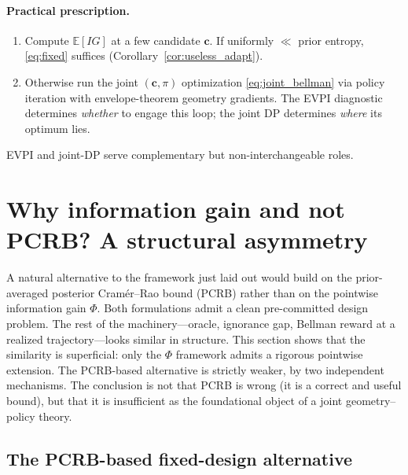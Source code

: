 \documentclass[11pt,a4paper]{article}
\newcommand{\E}{\mathbb{E}}
\begin{document}
\paragraph{Practical prescription.}
\begin{enumerate}[nosep, leftmargin=2em]
  \item Compute $\E[IG]$ at a few candidate $\bm{c}$.  If uniformly $\ll$ prior entropy, \eqref{eq:fixed} suffices (Corollary~\ref{cor:useless_adapt}).
  \item Otherwise run the joint $(\bm{c}, \pi)$ optimization \eqref{eq:joint_bellman} via policy iteration with envelope-theorem geometry gradients.  The EVPI diagnostic determines \emph{whether} to engage this loop; the joint DP determines \emph{where} its optimum lies.
\end{enumerate}
EVPI and joint-DP serve complementary but non-interchangeable roles.

\section{Why information gain and not PCRB? A structural asymmetry}
\label{sec:phi_vs_pcrb}

A natural alternative to the framework just laid out would build on the prior-averaged posterior Cram\'er--Rao bound (PCRB) rather than on the pointwise information gain $\Phi$.  Both formulations admit a clean pre-committed design problem.  The rest of the machinery---oracle, ignorance gap, Bellman reward at a realized trajectory---looks similar in structure.  This section shows that the similarity is superficial: only the $\Phi$ framework admits a rigorous pointwise extension.  The PCRB-based alternative is strictly weaker, by two independent mechanisms.  The conclusion is not that PCRB is wrong (it is a correct and useful bound), but that it is insufficient as the foundational object of a joint geometry--policy theory.

\subsection{The PCRB-based fixed-design alternative}
\label{subsec:pcrb_alternative}
\end{document}
